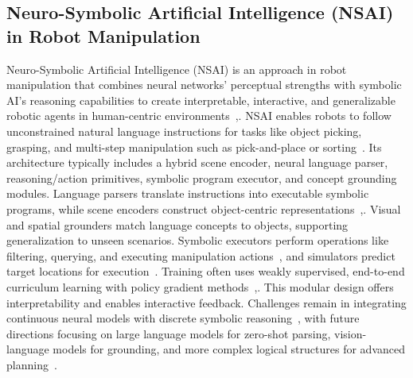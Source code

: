 \documentclass[12pt]{extarticle}
\begin{document}
\subsection{Neuro-Symbolic Artificial Intelligence (NSAI) in Robot Manipulation}
Neuro-Symbolic Artificial Intelligence (NSAI) is an approach in robot manipulation that combines neural networks’ perceptual strengths with symbolic AI’s reasoning capabilities to create interpretable, interactive, and generalizable robotic agents in human-centric environments~\cite{enhancing-interpret},\cite{nsai}. NSAI enables robots to follow unconstrained natural language instructions for tasks like object picking, grasping, and multi-step manipulation such as pick-and-place or sorting~\cite{learning-neuro-symbolic}. Its architecture typically includes a hybrid scene encoder, neural language parser, reasoning/action primitives, symbolic program executor, and concept grounding modules. Language parsers translate instructions into executable symbolic programs, while scene encoders construct object-centric representations~\cite{enhancing-interpret},\cite{learning-neuro-symbolic}. Visual and spatial grounders match language concepts to objects, supporting generalization to unseen scenarios. Symbolic executors perform operations like filtering, querying, and executing manipulation actions~\cite{enhancing-interpret}, and simulators predict target locations for execution~\cite{learning-neuro-symbolic}. Training often uses weakly supervised, end-to-end curriculum learning with policy gradient methods~\cite{learning-neuro-symbolic},\cite{ns-vqa}. This modular design offers interpretability and enables interactive feedback. Challenges remain in integrating continuous neural models with discrete symbolic reasoning~\cite{nsai}, with future directions focusing on large language models for zero-shot parsing, vision-language models for grounding, and more complex logical structures for advanced planning~\cite{enhancing-interpret}.

\newpage
\end{document}

